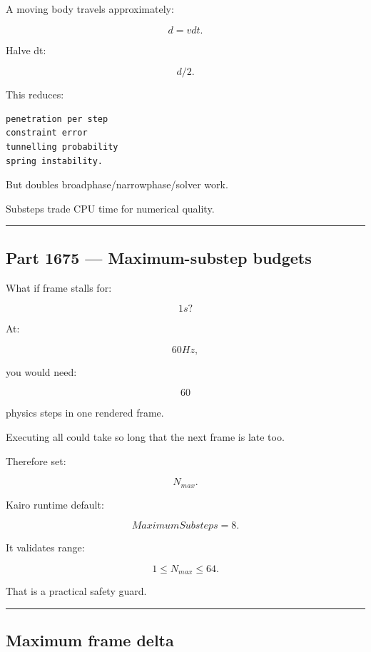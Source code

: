 A moving body travels approximately:

\[
d=vdt.
\]

Halve dt:

\[
d/2.
\]

This reduces:

\begin{verbatim}
penetration per step
constraint error
tunnelling probability
spring instability.
\end{verbatim}

But doubles broadphase/narrowphase/solver work.

Substeps trade CPU time for numerical quality.

\begin{center}\rule{0.5\linewidth}{0.5pt}\end{center}

\subsection{Part 1675 --- Maximum-substep budgets}\label{06-engine-ii-ch037-part-1675-maximum-substep-budgets}

What if frame stalls for:

\[
1s?
\]

At:

\[
60Hz,
\]

you would need:

\[
60
\]

physics steps in one rendered frame.

Executing all could take so long that the next frame is late too.

Therefore set:

\[
N_{max}.
\]

Kairo runtime default:

\[
\boxed{
MaximumSubsteps=8.
}
\]

It validates range:

\[
1\le N_{max}\le64.
\]

That is a practical safety guard.

\begin{center}\rule{0.5\linewidth}{0.5pt}\end{center}

\subsection{Maximum frame delta}\label{06-engine-ii-ch037-maximum-frame-delta}

